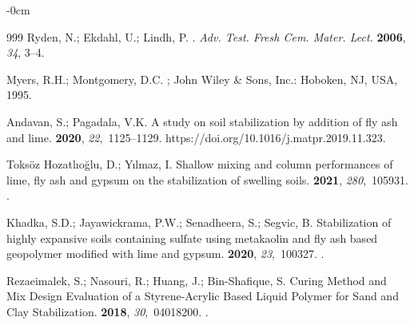 \documentclass[constrmater,article,accept,pdftex,moreauthors]{Definitions/mdpi}
\begin{document}
\begin{adjustwidth}{-\extralength}{0cm}
\begin{thebibliography}{999}
Ryden, N.; Ekdahl, U.; Lindh, P.
.
\newblock \emph{Adv. Test. Fresh Cem. Mater. Lect.} \textbf{2006}, \emph{34}, 3--4. %

Myers, R.H.; Montgomery, D.C.
; John Wiley \& Sons, Inc.: Hoboken, NJ, USA, %
   1995.

Andavan, S.; Pagadala, V.K.
\newblock A study on soil stabilization by addition of fly ash and lime.
 {\bf 2020}, {\em 22},~1125--1129.
 {{https://doi.org/10.1016/j.matpr.2019.11.323}}.

{Toksöz Hozatlıoğlu}, D.; Yılmaz, I.
\newblock Shallow mixing and column performances of lime, fly ash and gypsum on
  the stabilization of swelling soils.
 {\bf 2021}, {\em 280},~105931.
.

Khadka, S.D.; Jayawickrama, P.W.; Senadheera, S.; Segvic, B.
\newblock Stabilization of highly expansive soils containing sulfate using
  metakaolin and fly ash based geopolymer modified with lime and gypsum.
 {\bf 2020}, {\em 23},~100327.
.

Rezaeimalek, S.; Nasouri, R.; Huang, J.; Bin-Shafique, S.
\newblock Curing Method and Mix Design Evaluation of a Styrene-Acrylic Based
  Liquid Polymer for Sand and Clay Stabilization.
 {\bf 2018}, {\em
  30},~04018200.
.


\end{thebibliography}
\end{adjustwidth}
\end{document}
